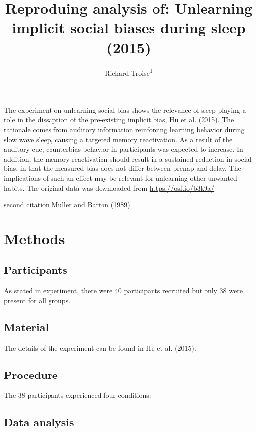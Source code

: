 \documentclass[man,floatsintext]{apa6}
\title{Reproduing analysis of: Unlearning implicit social biases during sleep
(2015)}
\author{Richard Troise\textsuperscript{1}}
\date{}
\affiliation{
\vspace{0.5cm}
\textsuperscript{1} Brooklyn College}
\begin{document}
\maketitle

The experiment on unlearning social bias shows the relevance of sleep
playing a role in the dissaption of the pre-existing implicit bias, Hu
et al. (2015). The rationale comes from auditory information reinforcing
learning behavior during slow wave sleep, causing a targeted memory
reactivation. As a result of the auditory cue, counterbias behavior in
participants was expected to increase. In addition, the memory
reactivation should result in a sustained reduction in social bias, in
that the measured bias does not differ between prenap and delay. The
implications of such an effect may be relevant for unlearning other
unwanted habits. The original data was downloaded from
\href{https://osf.io/b7x8q/}{https://osf.io/b3k9a/}

second citation Muller and Barton (1989)

\section{Methods}\label{methods}

\subsection{Participants}\label{participants}

As stated in experiment, there were 40 participants recruited but only
38 were present for all groups.

\subsection{Material}\label{material}

The details of the experiment can be found in Hu et al. (2015).

\subsection{Procedure}\label{procedure}

The 38 participants experienced four conditions:

\subsection{Data analysis}\label{data-analysis}
\end{document}
